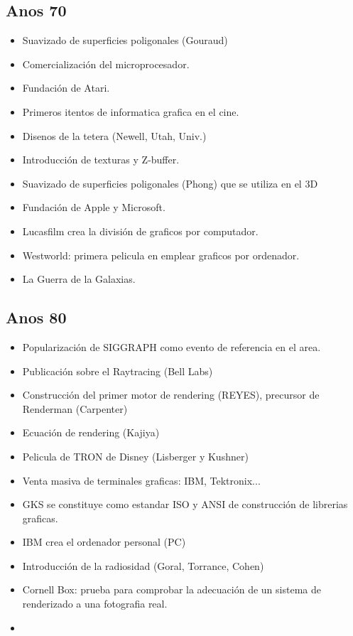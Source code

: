\documentclass[12pt, twoside, openright]{report} %
\begin{document}
\subsection{Anos 70}
\begin{itemize}
  \item Suavizado de superficies poligonales (Gouraud)
  \item Comercialización del microprocesador.
  \item Fundación de Atari.
  \item Primeros itentos de informatica grafica en el cine.
  \item Disenos de la tetera (Newell, Utah, Univ.)
  \item Introducción de texturas y Z-buffer.
  \item Suavizado de superficies poligonales (Phong) que se utiliza en el 3D
  \item Fundación de Apple y Microsoft.
  \item Lucasfilm crea la división de graficos por computador.
  \item Westworld: primera pelicula en emplear graficos por ordenador.
  \item La Guerra de la Galaxias.
\end{itemize}

  \subsection{Anos 80}
\begin{itemize}
  \item Popularización de SIGGRAPH como evento de referencia en el area.
  \item Publicación sobre el Raytracing (Bell Labs)
  \item Construcción del primer motor de rendering (REYES), precursor de Renderman (Carpenter)
  \item Ecuación de rendering (Kajiya)
  \item Pelicula de TRON de Disney (Lisberger y Kushner)
  \item Venta masiva de terminales graficas: IBM, Tektronix...
  \item GKS se constituye como estandar ISO y ANSI de construcción de librerias graficas.
  \item IBM crea el ordenador personal (PC)
  \item Introducción de la radiosidad (Goral, Torrance, Cohen)
  \item Cornell Box: prueba para comprobar la adecuación de un sistema de renderizado a una fotografia real.
  \item
\end{itemize}
\end{document}
